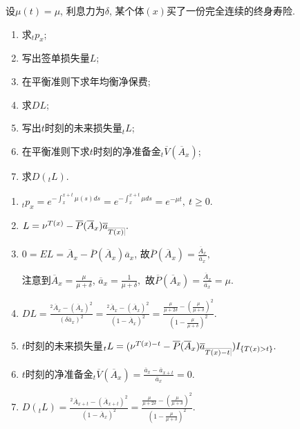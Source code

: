 \documentclass[lang=cn,10pt]{elegantbook}
\makeatletter
\DeclareRobustCommand{\annu}[1]{_{%
    \def\arraystretch{0}%
    \setlength\arraycolsep{1pt}%
    \setlength\arrayrulewidth{.2pt}%
    \begin{array}[b]{@{}c|}\hline
        \\[\arraycolsep]%
        \scriptstyle #1%
    \end{array}%
}}
\makeatother
\begin{document}
\begin{example}\label{l5.1}
    设$\mu(t)=\mu$, 利息力为$\delta$, 某个体$(x)$买了一份完全连续的终身寿险.
    \begin{enumerate}[(1)]
        \item 求${}_tp_x$;
        \item 写出签单损失量$L$;
        \item 在平衡准则下求年均衡净保费;
        \item 求$DL$;
        \item 写出$t$时刻的未来损失量${}_tL$;
        \item 在平衡准则下求$t$时刻的净准备金$_t\overline{V}(\overline A_x)$;
        \item 求$D({}_tL).$
    \end{enumerate}
\end{example}
\begin{solution}
    \begin{enumerate}[(1)]
        \item $_tp_x=e^{-\int_x^{x+t}\mu(s)ds}=e^{-\int_x^{x+t}\mu ds}=e^{-\mu t},\ t\ge 0.$
        \item $L=\nu^{T(x)}-\overline P(\overline A_x)\overline a_{\annu {T(x)}}.$
        \item $0=EL=\overline A_x-\overline P(\overline A_x)\overline a_x$, 故$\overline P(\overline A_x)=\frac{\overline A_x}{\overline a_x},$

              注意到$\overline A_x=\frac{\mu}{\mu+\delta}$, $\overline a_x=\frac{1}{\mu+\delta},$
              故$\overline P(\overline A_x)=\frac{\overline A_x}{\overline a_x}=\mu.$
        \item $DL=\frac{^2\overline A_{x}-(\overline A_{x})^2}{(\delta\overline a_x)^2}=\frac{^2\overline A_{x}-(\overline A_{x})^2}{(1-\overline A_x)^2}=\frac{\frac{\mu}{\mu+2\delta}-(\frac{\mu}{\mu+\delta})^2}{(1-\frac{\mu}{\mu+\delta})^2}.$
        \item $t$时刻的未来损失量${}_tL= (\nu^{T(x)-t}-\overline{P}( \overline{A}_x )\overline a_{\annu {T(x)-t}} )I_{\{T(x)>t\}}.$
        \item $t$时刻的净准备金$ {}_t\overline{V}(\overline A_x)=\frac{\overline a_{x}-\overline a_{x+t}}{\overline a_x}=0.$
        \item $D({}_tL)=\frac{^2\overline A_{x+t}-(\overline A_{x+t})^2}{(1-\overline A_x)^2}=\frac{\frac{\mu}{\mu+2\delta}-(\frac{\mu}{\mu+\delta})^2}{(1-\frac{\mu}{\mu+\delta})^2}.$
    \end{enumerate}
\end{solution}
\end{document}
